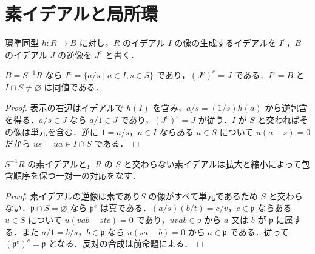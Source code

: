 \section{素イデアルと局所環}
\begin{defn}[イデアルの拡大と縮小]
環準同型 $h:R\to B$ に対し，$R$ のイデアル $I$ の像の生成するイデアルを $I^e$，$B$ のイデアル $J$ の逆像を $J^c$ と書く．
\end{defn}
\begin{prop}[局所化イデアルの表示]
$B=S^{-1}R$ なら $I^e=\{a/s\mid a\in I,s\in S\}$ であり，$(J^c)^e=J$ である．$I^e=B$ と $I\cap S\ne\varnothing$ は同値である．
\end{prop}
\begin{proof}
表示の右辺はイデアルで $h(I)$ を含み，$a/s=(1/s)h(a)$ から逆包含を得る．$a/s\in J$ なら $a/1\in J$ であり，$(J^c)^e=J$ が従う．$I$ が $S$ と交わればその像は単元を含む．逆に $1=a/s$，$a\in I$ ならある $u\in S$ について $u(a-s)=0$ だから $us=ua\in I\cap S$ である．
\end{proof}
\begin{prop}[局所化の素イデアル対応]
$S^{-1}R$ の素イデアルと，$R$ の $S$ と交わらない素イデアルは拡大と縮小によって包含順序を保つ一対一の対応をなす．
\end{prop}
\begin{proof}
素イデアルの逆像は素であり$S$ の像がすべて単元であるため $S$ と交わらない．$\mathfrak p\cap S=\varnothing$ なら $\mathfrak p^e$ は真である．$(a/s)(b/t)=c/v$，$c\in\mathfrak p$ ならある $u\in S$ について $u(vab-stc)=0$ であり，$uvab\in\mathfrak p$ から $a$ 又は $b$ が $\mathfrak p$ に属する．また $a/1=b/s$，$b\in\mathfrak p$ なら $u(sa-b)=0$ から $a\in\mathfrak p$ である．従って $(\mathfrak p^e)^c=\mathfrak p$ となる．反対の合成は前命題による．
\end{proof}
